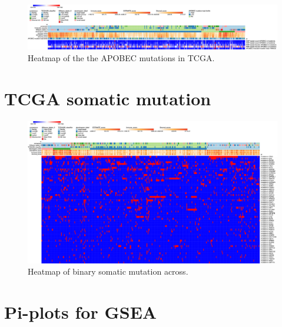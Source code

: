 \begin{figure}[!htb]   
    \centering
    \includegraphics[width=1.0\textwidth,keepaspectratio]{Sections/Network_I/Resources/selective_pruning/sel_tfs/sel_tfs_apobec_meta.png}
      \caption{Heatmap of the the APOBEC mutations in TCGA.}
    \label{fig:ap:sel_tfs_tcga_meta_apobec}
\end{figure}

\newpage 

\section{TCGA somatic mutation} \label{s:ap:sel_prun_mut}

\begin{figure}[!htb]   
    \centering
    \includegraphics[width=1.0\textwidth,height=1.0\textheight,keepaspectratio]{Sections/Network_I/Resources/selective_pruning/sel_tfs/sel_tfs_mut_meta.png}
      \caption{Heatmap of binary somatic mutation across.}
    \label{fig:ap:sel_tfs_tcga_meta_mut}
\end{figure}

\newpage

\section{Pi-plots for GSEA} \label{s:ap:sel_prun_pi}


